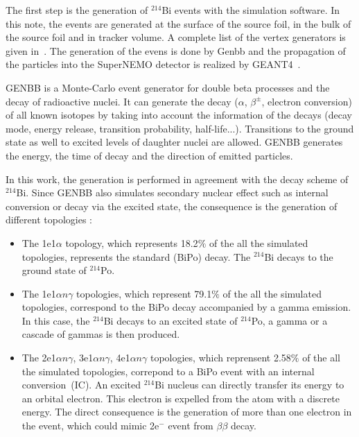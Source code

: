 \documentclass[main.tex]{subfiles}
\begin{document}
\noindent The first step is the generation of $^{\text{214}}$Bi events with the simulation software. In this note, the events are generated at the surface of the source foil, in the bulk of the source foil and in tracker volume. A complete list of the vertex generators is given in~\cite{FalaiseUserGuide}. The generation of the evens is done by Genbb and the propagation of the particles into the SuperNEMO detector is realized by GEANT4~\cite{GEANT4}.


\bigskip


\noindent GENBB is a Monte-Carlo event generator for double beta processes and the decay of radioactive nuclei. It can generate the decay ($\alpha$, $\beta^\pm$, electron conversion) of all known isotopes by taking into account the information of the decays (decay mode, energy release, transition probability, half-life...). Transitions to the ground state as well to excited levels of daughter nuclei are allowed. GENBB generates the energy, the time of decay and the direction of emitted particles.


\bigskip 


\noindent In this work, the generation is performed in agreement with the decay scheme of $^{\text{214}}$Bi. Since GENBB also simulates secondary nuclear effect such as internal conversion or decay via the excited state, the consequence is the generation of different topologies :


\begin{itemize}
\item The 1e1$\alpha$ topology, which represents 18.2$\%$ of the all the simulated topologies, represents the standard (BiPo) decay. The $^{\text{214}}$Bi decays to the ground state of $^{\text{214}}$Po.


\item The 1e1$\alpha n\gamma$ topologies, which represent 79.1$\%$ of the all the simulated topologies, correspond to the BiPo decay accompanied by a gamma emission. In this case, the $^{\text{214}}$Bi decays to an excited state of $^{\text{214}}$Po, a gamma or a cascade of gammas is then produced.


\item The 2e1$\alpha n\gamma$, 3e1$\alpha n\gamma$, 4e1$\alpha n\gamma$ topologies, which reprensent 2.58$\%$ of the all the simulated topologies, correpond to a BiPo event with an internal conversion~(IC). An excited $^{\text{214}}$Bi nucleus can directly transfer its energy to an orbital electron. This electron is expelled from the atom with a discrete energy. The direct consequence is the generation of more than one electron in the event, which could mimic 2e$^-$ event from $\beta\beta$ decay.


\end{itemize}
\end{document}
